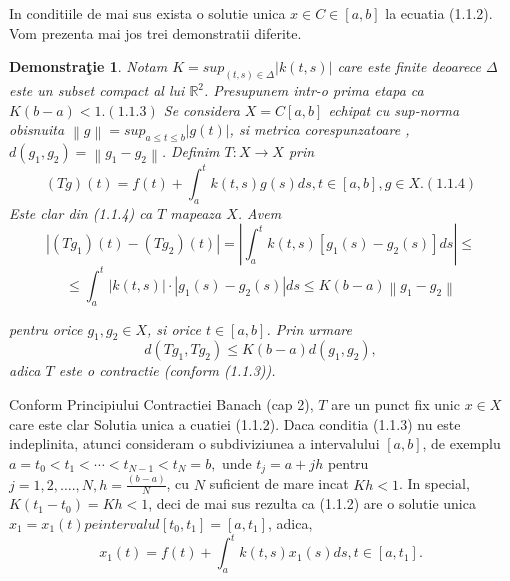 \documentclass[a4paper,12pt,oneside]{report}
\newtheorem{demonstration}{Demonstra\c tie}
\begin{document}
In conditiile de mai sus exista o solutie unica \(x\in C\in \left [ a,b \right ]\) la ecuatia (1.1.2).
Vom prezenta mai jos trei demonstratii diferite.

\begin{demonstration}
					
	Notam \(K = sup_{\left ( t,s \right )\in \Delta }\left | k\left ( t,s \right ) \right |\) care este finite deoarece \(\Delta\) este un subset compact al lui \(\mathbb{R}^{2}\). Presupunem intr-o prima etapa ca 
	\(K\left ( b-a \right ) < 1. (1.1.3)\)
	Se considera \(X = C\left [ a,b \right ]\) echipat cu sup-norma obisnuita \(\left \| g \right \| = sup_{a\leq t\leq b}\left | g\left ( t \right ) \right |\),  si metrica corespunzatoare , \(d\left ( g_{1}, g_{2} \right ) = \left \| g_{1} - g_{2} \right \|\). 
	Definim \(T : X \rightarrow X\) prin 
	\begin{displaymath}
		\left ( Tg \right )\left ( t \right ) = f\left ( t \right ) + \int_{a}^{t}k\left ( t,s \right )g\left ( s \right )ds, t\in \left [ a,b \right ], g\in X. (1.1.4)
	\end{displaymath}
	Este clar din (1.1.4) ca \(T\) mapeaza \(X\). Avem
	\begin{displaymath}
		\left | \left ( Tg_{1} \right )\left ( t \right ) - \left ( Tg_{2} \right )\left ( t \right )  \right | = \left | \int_{a}^{t}k\left ( t,s \right )\left [ g_{1}\left ( s \right ) - g_{2}\left ( s \right ) \right ]ds \right |\leq
	\end{displaymath}
	\begin{displaymath}
		\leq \int_{a}^{t}\left | k\left ( t,s \right ) \right |\cdot \left | g_{1}\left ( s \right ) - g_{2}\left ( s \right ) \right |ds \leq K \left ( b-a \right )\left \| g_{1} - g_{2} \right \|
	\end{displaymath}
					
					
	pentru orice \(g_{1}, g_{2} \in X\), si orice  \(t\in \left [ a,b \right ]\). 
	Prin urmare 
	\begin{displaymath}
		d\left ( Tg_{1} , Tg_{2}\right )\leq K\left ( b-a \right )d\left ( g_{1}, g_{2} \right ), 
	\end{displaymath}
	adica \(T\) este o contractie (conform (1.1.3)).
					
\end{demonstration}


Conform Principiului Contractiei Banach (cap 2), \(T\) are un punct fix unic \(x \in  X\) care este clar Solutia unica a cuatiei (1.1.2).
Daca conditia (1.1.3) nu este indeplinita, atunci consideram o subdiviziunea a intervalului \(\left [ a,b \right ]\), de exemplu 
\(a = t_{0}< t_{1}< \cdots < t_{N-1}< t_{N} = b,
\)
unde \(t_{j} = a + jh\) pentru \(j = 1,2,….,N, h = \frac{\left ( b-a \right )}{N}\), cu \(N\) suficient de mare incat \(Kh < 1\). In special, \(K\left ( t_{1}  - t_{0}\right ) = Kh< 1\), deci de mai sus rezulta ca (1.1.2) are o solutie unica \(x_{1} = x_{1}\left ( t \right ) pe intervalul \left [ t_{0} , t_{1} \right ] = \left [ a, t_{1} \right ]\), adica, 
\begin{displaymath}
	x_{1}\left ( t \right ) = f\left ( t \right ) + \int_{a}^{t}k\left ( t,s \right )x_{1}\left ( s \right )ds, t \in \left [ a, t_{1} \right ]. 
\end{displaymath}
\end{document}
